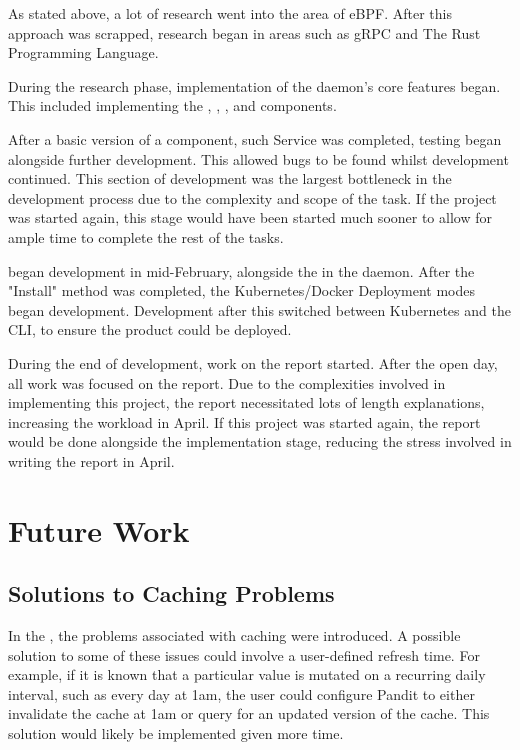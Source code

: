 \documentclass[a4paper,12pt]{report}
\begin{document}
As stated above, a lot of research went into the area of eBPF. After this approach was scrapped, research began in areas such as gRPC and The Rust Programming Language.

During the research phase, implementation of the daemon's core features began. This included implementing the , , ,  and  components.

After a basic version of a component, such Service was completed, testing began alongside further development. This allowed bugs to be found whilst development continued.
This section of development was the largest bottleneck in the development process due to the complexity and scope of the task.
If the project was started again, this stage would have been started much sooner to allow for ample time to complete the rest of the tasks.

 began development in mid-February, alongside the  in the daemon. After the "Install" method was completed,
the Kubernetes/Docker Deployment modes began development. Development after this switched between Kubernetes and the CLI, to ensure the product could be deployed.

During the end of development, work on the report started. After the open day, all work was focused on the report.
Due to the complexities involved in implementing this project, the report necessitated lots of length explanations, increasing the workload in April.
If this project was started again, the report would be done alongside the implementation stage, reducing the stress involved in writing the report in April.

\section{Future Work}
\label{sec:future}
\subsection{Solutions to Caching Problems}
In the , the problems associated with caching were introduced.
A possible solution to some of these issues could involve a user-defined refresh time. For example, if it is known that a particular value is mutated on a recurring daily interval, such as every day at 1am, the user could configure Pandit to either invalidate the cache at 1am or query for an updated version of the cache.
This solution would likely be implemented given more time.
\end{document}

